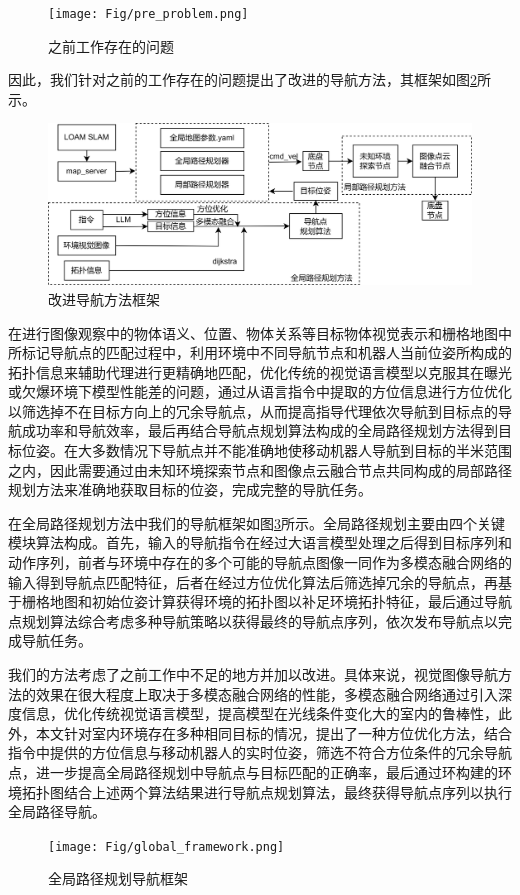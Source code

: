 \begin{figure}[htbp]
    \centering
    \texttt{[image: Fig/pre\_problem.png]}
    \caption{\label{preview_problem}之前工作存在的问题}
\end{figure}


因此，我们针对之前的工作存在的问题提出了改进的导航方法，其框架如图\ref{buchong2}所示。
\begin{figure}[htbp]
    \centering
    \includegraphics[scale=0.08]{Fig/补充2自己方法框架.png}
    \caption{\label{buchong2}改进导航方法框架}
\end{figure}
在进行图像观察中的物体语义、位置、物体关系等目标物体视觉表示和栅格地图中所标记导航点的匹配过程中，利用环境中不同导航节点和机器人当前位姿所构成的拓扑信息来辅助代理进行更精确地匹配，优化传统的视觉语言模型以克服其在曝光或欠爆环境下模型性能差的问题，通过从语言指令中提取的方位信息进行方位优化以筛选掉不在目标方向上的冗余导航点，从而提高指导代理依次导航到目标点的导航成功率和导航效率，最后再结合导航点规划算法构成的全局路径规划方法得到目标位姿。在大多数情况下导航点并不能准确地使移动机器人导航到目标的半米范围之内，因此需要通过由未知环境探索节点和图像点云融合节点共同构成的局部路径规划方法来准确地获取目标的位姿，完成完整的导肮任务。


在全局路径规划方法中我们的导航框架如图\ref{global_framework}所示。全局路径规划主要由四个关键模块算法构成。首先，输入的导航指令在经过大语言模型处理之后得到目标序列和动作序列，前者与环境中存在的多个可能的导航点图像一同作为多模态融合网络的输入得到导航点匹配特征，后者在经过方位优化算法后筛选掉冗余的导航点，再基于栅格地图和初始位姿计算获得环境的拓扑图以补足环境拓扑特征，最后通过导航点规划算法综合考虑多种导航策略以获得最终的导航点序列，依次发布导航点以完成导航任务。

我们的方法考虑了之前工作中不足的地方并加以改进。具体来说，视觉图像导航方法的效果在很大程度上取决于多模态融合网络的性能，多模态融合网络通过引入深度信息，优化传统视觉语言模型，提高模型在光线条件变化大的室内的鲁棒性，此外，本文针对室内环境存在多种相同目标的情况，提出了一种方位优化方法，结合指令中提供的方位信息与移动机器人的实时位姿，筛选不符合方位条件的冗余导航点，进一步提高全局路径规划中导航点与目标匹配的正确率，最后通过环构建的环境拓扑图结合上述两个算法结果进行导航点规划算法，最终获得导航点序列以执行全局路径导航。
\begin{figure}[htbp]
    \centering
    \texttt{[image: Fig/global\_framework.png]}
    \caption{\label{global_framework}全局路径规划导航框架}
\end{figure}


